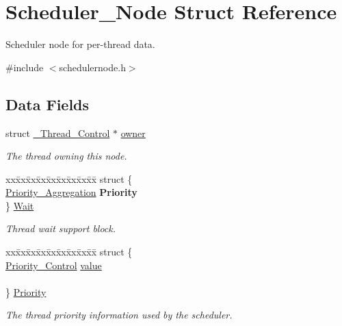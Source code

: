 \hypertarget{structScheduler__Node}{}\section{Scheduler\+\_\+\+Node Struct Reference}
\label{structScheduler__Node}


Scheduler node for per-\/thread data.  




{\ttfamily \#include $<$schedulernode.\+h$>$}

\subsection*{Data Fields}
\begin{DoxyCompactItemize}
\item 
\mbox{\label{structScheduler__Node_a994f6a9e748421b4077b7312b7c472aa}} 
struct \mbox{\hyperlink{struct__Thread__Control}{\+\_\+\+Thread\+\_\+\+Control}} $\ast$ \mbox{\hyperlink{structScheduler__Node_a994f6a9e748421b4077b7312b7c472aa}{owner}}
\begin{DoxyCompactList}\small\item\em The thread owning this node. \end{DoxyCompactList}\item 
\mbox{\label{structScheduler__Node_a280362c9060aa96a540a64a5b066d449}} 
\begin{tabbing}
xx\=xx\=xx\=xx\=xx\=xx\=xx\=xx\=xx\=\kill
struct \{\\
\>\mbox{\hyperlink{structPriority__Aggregation}{Priority\_Aggregation}} {\bfseries Priority}\\
\} \mbox{\hyperlink{structScheduler__Node_a280362c9060aa96a540a64a5b066d449}{Wait}}\\

\end{tabbing}\begin{DoxyCompactList}\small\item\em Thread wait support block. \end{DoxyCompactList}\item 
\begin{tabbing}
xx\=xx\=xx\=xx\=xx\=xx\=xx\=xx\=xx\=\kill
struct \{\\
\>\mbox{\hyperlink{group__RTEMSScorePriority_ga59d02b58072d31a9a1cfe644557aefe2}{Priority\_Control}} \mbox{\hyperlink{structScheduler__Node_a0223e20a233540fd2a75e50e2141a2b7}{value}}\\
\>\\
\} \mbox{\hyperlink{structScheduler__Node_aad013001a975d1ea432ff3ef76a24c46}{Priority}}\\

\end{tabbing}\begin{DoxyCompactList}\small\item\em The thread priority information used by the scheduler. \end{DoxyCompactList}\end{DoxyCompactItemize}


